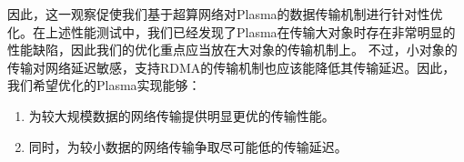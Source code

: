 因此，这一观察促使我们基于超算网络对Plasma的数据传输机制进行针对性优化。在上述性能测试中，我们已经发现了Plasma在传输大对象时存在非常明显的性能缺陷，因此我们的优化重点应当放在大对象的传输机制上。
不过，小对象的传输对网络延迟敏感，支持RDMA的传输机制也应该能降低其传输延迟。因此，我们希望优化的Plasma实现能够：

\begin{enumerate}
    \item 为较大规模数据的网络传输提供明显更优的传输性能。
    \item 同时，为较小数据的网络传输争取尽可能低的传输延迟。
\end{enumerate}